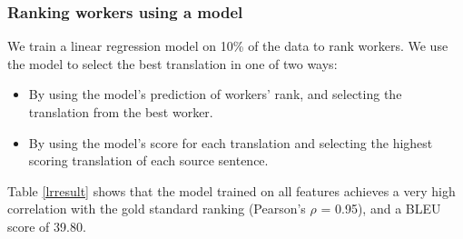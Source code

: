 \documentclass[11pt,letterpaper]{article}
\begin{document}



\subsubsection{Ranking workers using a model}
We train a linear regression model on 10\% of the data to rank workers.  We use the model to select the best translation in one of two ways:
\begin{itemize}
\setlength\itemsep{0em}
\item By using the model's prediction of workers' rank, and selecting the translation from the best worker.  
\item By using the model's score for each translation and selecting the highest scoring translation of each source sentence. 
\end{itemize}

Table \ref{lrresult} shows that the model trained on all features achieves a very high correlation with the gold standard ranking (Pearson's $\rho$ = 0.95), and a  BLEU score of 39.80.
\end{document}
